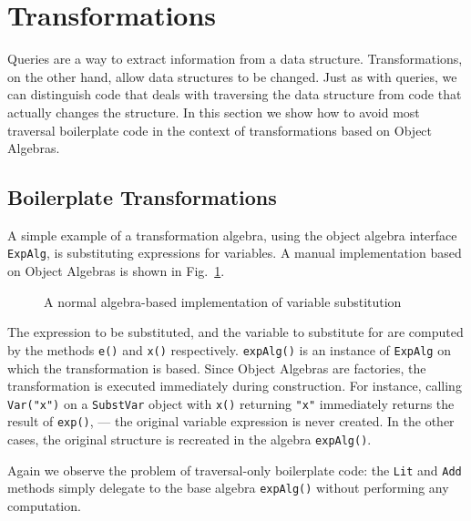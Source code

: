 \section{Transformations}\label{sec:transformations}
\label{retroimp}

Queries are a way to extract information from a data structure.
Transformations, on the other hand, allow data structures to be
changed. Just as with queries, we can distinguish code that deals with
traversing the data structure from code that actually changes the
structure. In this section we show how to avoid most traversal
boilerplate code in the context of transformations based on Object
Algebras.


\subsection{Boilerplate Transformations}\label{subsec:substvars}

A simple example of a transformation algebra, using the object
algebra interface \lstinline{ExpAlg}, is substituting expressions for
variables. A manual implementation based on Object Algebras is shown
in Fig.~\ref{substvars_without_id}.

\begin{figure}[t]
\vspace{-.1in}
\caption{A normal algebra-based implementation of variable substitution}
\label{substvars_without_id}
\end{figure}

The expression to be substituted, and the variable to substitute for
are computed by the methods \lstinline{e()} and \lstinline{x()}
respectively. \lstinline{expAlg()} is an instance of
\lstinline{ExpAlg} on which the transformation is based. Since Object
Algebras are factories, the transformation is executed immediately
during construction. For instance, calling \lstinline{Var("x")} on a
\lstinline{SubstVar} object with \lstinline{x()} returning
\lstinline{"x"} immediately returns the result of \lstinline{exp()},
--- the original variable expression is never created. In the other
cases, the original structure is recreated in the algebra
\lstinline{expAlg()}.

Again we observe the problem of traversal-only boilerplate code: the
\lstinline{Lit} and \lstinline{Add} methods simply delegate to the
base algebra \lstinline{expAlg()} without performing any computation.

